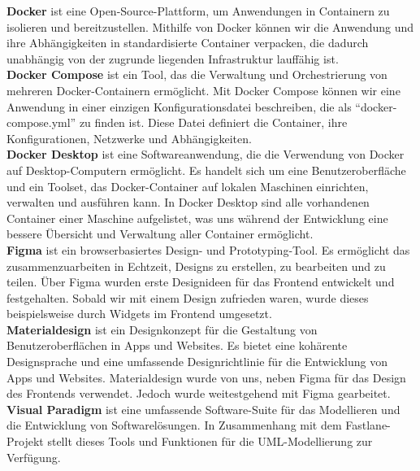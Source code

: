 \textbf{Docker} ist eine Open-Source-Plattform, um Anwendungen in Containern zu isolieren und bereitzustellen.
Mithilfe von Docker können wir die Anwendung und ihre Abhängigkeiten in standardisierte Container verpacken, die dadurch unabhängig von der zugrunde liegenden Infrastruktur lauffähig ist.\\

\textbf{Docker Compose}  ist ein Tool, das die Verwaltung und Orchestrierung von mehreren Docker-Containern ermöglicht.
Mit Docker Compose können wir eine Anwendung in einer einzigen Konfigurationsdatei beschreiben, die als \enquote{docker-compose.yml} zu finden ist.
Diese Datei definiert die Container, ihre Konfigurationen, Netzwerke und Abhängigkeiten.\\

\textbf{Docker Desktop} ist eine Softwareanwendung, die die Verwendung von Docker auf Desktop-Computern ermöglicht.
Es handelt sich um eine Benutzeroberfläche und ein Toolset, das Docker-Container auf lokalen Maschinen einrichten, verwalten und ausführen kann.
In Docker Desktop sind alle vorhandenen Container einer Maschine aufgelistet, was uns während der Entwicklung eine bessere Übersicht und Verwaltung aller Container ermöglicht.\\

\textbf{Figma} ist ein browserbasiertes Design- und Prototyping-Tool.
Es ermöglicht das zusammenzuarbeiten in Echtzeit, Designs zu erstellen, zu bearbeiten und zu teilen.
Über Figma wurden erste Designideen für das Frontend entwickelt und festgehalten.
Sobald wir mit einem Design zufrieden waren, wurde dieses beispielsweise durch Widgets im Frontend umgesetzt.\\

\textbf{Materialdesign} ist ein Designkonzept für die Gestaltung von Benutzeroberflächen in Apps und Websites.
Es bietet eine kohärente Designsprache und eine umfassende Designrichtlinie für die Entwicklung von Apps und Websites.
Materialdesign wurde von uns, neben Figma für das Design des Frontends verwendet.
Jedoch wurde weitestgehend mit Figma gearbeitet. \\

\textbf{Visual Paradigm} ist eine umfassende Software-Suite für das Modellieren und die Entwicklung von Softwarelösungen.
In Zusammenhang mit dem Fastlane-Projekt stellt dieses Tools und Funktionen für die UML-Modellierung zur Verfügung.\\

\newpage